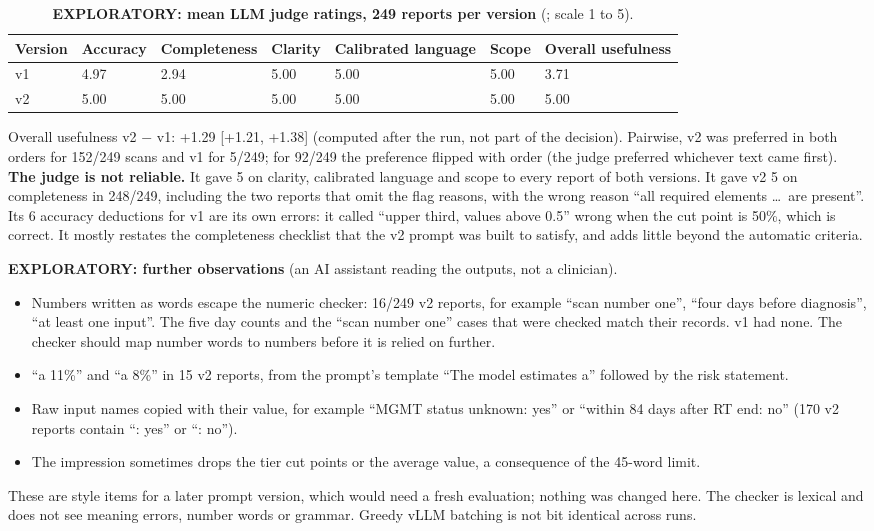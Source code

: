 \documentclass[11pt,a4paper]{article}
\begin{document}
\begin{table}[H]
\centering
\small
\renewcommand{\thetable}{S41}\renewcommand{\theHtable}{S41}
\caption{\textbf{EXPLORATORY: mean LLM judge ratings, 249 reports per version} (;
scale 1 to 5).}
\label{tab:S41}
\begin{tabularx}{\linewidth}{@{}L R{1.5cm} R{2.1cm} R{1.3cm} R{2.0cm} R{1.1cm} R{1.8cm}@{}}
\toprule
Version & Accuracy & Completeness & Clarity & Calibrated language & Scope & Overall usefulness \\
\midrule
v1 & 4.97 & 2.94 & 5.00 & 5.00 & 5.00 & 3.71 \\
v2 & 5.00 & 5.00 & 5.00 & 5.00 & 5.00 & 5.00 \\
\bottomrule
\end{tabularx}
\end{table}

Overall usefulness v2 $-$ v1: +1.29 [+1.21, +1.38] (computed after the run, not part of the decision). Pairwise, v2
was preferred in both orders for 152/249 scans and v1 for 5/249; for 92/249 the preference flipped with order (the
judge preferred whichever text came first). \textbf{The judge is not reliable.} It gave 5 on clarity, calibrated
language and scope to every report of both versions. It gave v2 5 on completeness in 248/249, including the two
reports that omit the flag reasons, with the wrong reason ``all required elements \ldots\ are present''. Its 6
accuracy deductions for v1 are its own errors: it called ``upper third, values above 0.5'' wrong when the cut point is
50\%, which is correct. It mostly restates the completeness checklist that the v2 prompt was built to satisfy, and
adds little beyond the automatic criteria.

\textbf{EXPLORATORY: further observations} (an AI assistant reading the outputs, not a clinician).
\begin{itemize}
\item Numbers written as words escape the numeric checker: 16/249 v2 reports, for example ``scan number one'', ``four
days before diagnosis'', ``at least one input''. The five day counts and the ``scan number one'' cases that were
checked match their records. v1 had none. The checker should map number words to numbers before it is relied on
further.
\item ``a 11\%'' and ``a 8\%'' in 15 v2 reports, from the prompt's template ``The model estimates a'' followed by the
risk statement.
\item Raw input names copied with their value, for example ``MGMT status unknown: yes'' or ``within 84 days after RT
end: no'' (170 v2 reports contain ``: yes'' or ``: no'').
\item The impression sometimes drops the tier cut points or the average value, a consequence of the 45-word limit.
\end{itemize}
These are style items for a later prompt version, which would need a fresh evaluation; nothing was changed here. The
checker is lexical and does not see meaning errors, number words or grammar. Greedy vLLM batching is not bit
identical across runs.
\end{document}
